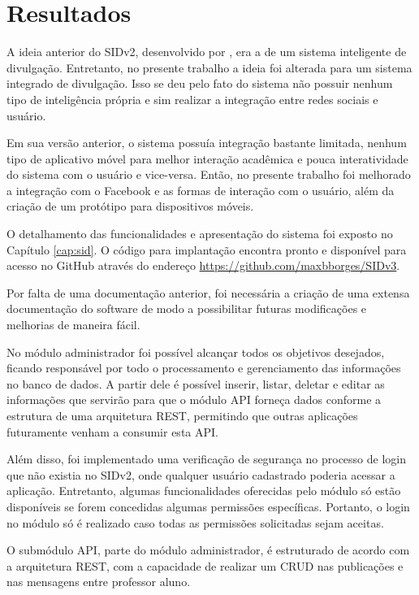 \chapter[Resultados]{Resultados}
\label{resultados}
A ideia anterior do SIDv2, desenvolvido por \cite{sobrinho2017}, era a de um sistema inteligente de divulgação. Entretanto, no presente trabalho a ideia foi alterada para um sistema integrado de divulgação. Isso se deu pelo fato do sistema não possuir nenhum tipo de inteligência própria e sim realizar a integração entre redes sociais e usuário.

Em sua versão anterior, o sistema possuía integração bastante limitada, nenhum tipo de aplicativo móvel para melhor interação acadêmica e pouca interatividade do sistema com o usuário e vice-versa. Então, no presente trabalho foi melhorado a integração com o Facebook e as formas de interação com o usuário, além da criação de um protótipo para dispositivos móveis.

O detalhamento das funcionalidades e apresentação do sistema foi exposto no Capítulo \ref{cap:sid}. O código para implantação encontra pronto e disponível para acesso no GitHub através do endereço \url{https://github.com/maxbborges/SIDv3}.
 
Por falta de uma documentação anterior, foi necessária a criação de uma extensa documentação do software de modo a possibilitar futuras modificações e melhorias de maneira fácil.

No módulo administrador foi possível alcançar todos os objetivos desejados, ficando responsável por todo o processamento e gerenciamento das informações no banco de dados. A partir dele é possível inserir, listar, deletar e editar as informações que servirão para que o módulo API forneça dados conforme a estrutura de uma arquitetura REST, permitindo que outras aplicações futuramente venham a consumir esta API.

Além disso, foi implementado uma verificação de segurança no processo de login que não existia no SIDv2, onde qualquer usuário cadastrado poderia acessar a aplicação. Entretanto, algumas funcionalidades oferecidas pelo módulo só estão disponíveis se forem concedidas algumas permissões específicas. Portanto, o login no módulo só é realizado caso todas as permissões solicitadas sejam aceitas.

O submódulo API, parte do módulo administrador, é estruturado de acordo com a arquitetura REST, com a capacidade de realizar um CRUD nas publicações e nas mensagens entre professor aluno.

